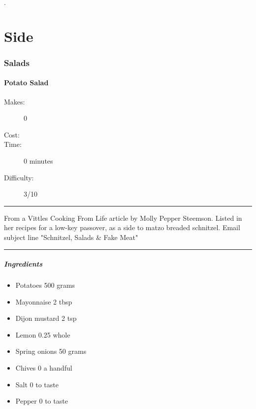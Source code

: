 \documentclass[]{article}
\begin{document}
\newpage
\color{white}.\color{black}
\vspace{5cm}
\part{\Huge Side}
\newpage
{}
\section*{\center\Huge\color{accent}Salads}
\label{cat:Salads}
\label{rec:Potato Salad}
\subsection*{\center\huge Potato Salad}
\begin{description}
\item[Makes:] 0 
\item[Cost:] \textdollar
\item[Time:] 0 minutes
\item[Difficulty:] 3/10
\end{description}
\vspace{0.2cm}\hrule\vspace{0.5cm}
\begin{adjustwidth}{0.5 cm}{0.5 cm}

From a Vittles Cooking From Life article by Molly Pepper Steemson. Listed in her recipes for a low-key passover, as a side to matzo breaded schnitzel. Email subject line "Schnitzel, Salads \& Fake Meat" \hfill\color{accent}{\Large\faVimeoSquare\hspace{0.1cm}\faGlide\hspace{0.1cm}\faTruck\hspace{0.1cm}}\color{black}

\end{adjustwidth}
\vspace{0.5cm}\hrule
\subsubsection*{\Large Ingredients}
\begin{multicols}{2}
\begin{itemize}
 \item Potatoes \hfill 500 grams
 \item Mayonnaise \hfill 2 tbsp
 \item Dijon mustard \hfill 2 tsp
 \item Lemon \hfill 0.25 whole
 \item Spring onions \hfill 50 grams
 \item Chives \hfill 0 a handful
 \item Salt \hfill 0 to taste
 \item Pepper \hfill 0 to taste
\end{itemize}
\end{multicols}
\end{document}
